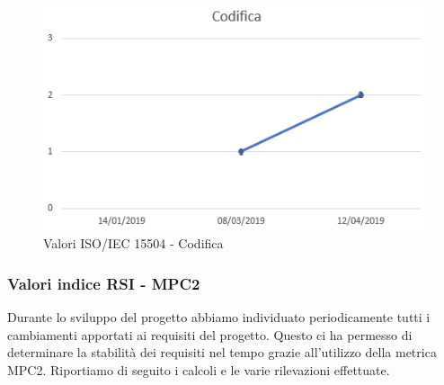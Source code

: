 \begin{figure}[H]
	\centering
	\includegraphics[scale=1]{images/resoconto/Codifica.png}
	\caption{Valori ISO/IEC 15504 - Codifica}	
\end{figure}

\subsubsection{Valori indice RSI - MPC2\\}
Durante lo sviluppo del progetto abbiamo individuato periodicamente tutti i cambiamenti apportati ai requisiti del progetto. Questo ci ha permesso di determinare la stabilità dei requisiti nel tempo grazie all'utilizzo della metrica MPC2.
Riportiamo di seguito i calcoli e le varie rilevazioni effettuate.

